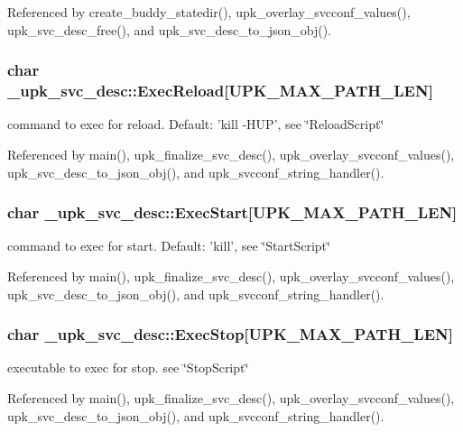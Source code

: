 Referenced by create\_\-buddy\_\-statedir(), upk\_\-overlay\_\-svcconf\_\-values(), upk\_\-svc\_\-desc\_\-free(), and upk\_\-svc\_\-desc\_\-to\_\-json\_\-obj().

\subsubsection[{ExecReload}]{\setlength{\rightskip}{0pt plus 5cm}char {\bf \_\-upk\_\-svc\_\-desc::ExecReload}[UPK\_\-MAX\_\-PATH\_\-LEN]}\label{struct__upk__svc__desc_a3759e27a023610aecef765eec3c84dda}
command to exec for reload. Default: 'kill -\/HUP', see \char`\"{}ReloadScript\char`\"{} 

Referenced by main(), upk\_\-finalize\_\-svc\_\-desc(), upk\_\-overlay\_\-svcconf\_\-values(), upk\_\-svc\_\-desc\_\-to\_\-json\_\-obj(), and upk\_\-svcconf\_\-string\_\-handler().

\subsubsection[{ExecStart}]{\setlength{\rightskip}{0pt plus 5cm}char {\bf \_\-upk\_\-svc\_\-desc::ExecStart}[UPK\_\-MAX\_\-PATH\_\-LEN]}\label{struct__upk__svc__desc_a1ec7b5c0c440bc0a7011fba7ff45edec}
command to exec for start. Default: 'kill', see \char`\"{}StartScript\char`\"{} 

Referenced by main(), upk\_\-finalize\_\-svc\_\-desc(), upk\_\-overlay\_\-svcconf\_\-values(), upk\_\-svc\_\-desc\_\-to\_\-json\_\-obj(), and upk\_\-svcconf\_\-string\_\-handler().

\subsubsection[{ExecStop}]{\setlength{\rightskip}{0pt plus 5cm}char {\bf \_\-upk\_\-svc\_\-desc::ExecStop}[UPK\_\-MAX\_\-PATH\_\-LEN]}\label{struct__upk__svc__desc_ab50cb8805f521274c6a47be718b71c1b}
executable to exec for stop. see \char`\"{}StopScript\char`\"{} 

Referenced by main(), upk\_\-finalize\_\-svc\_\-desc(), upk\_\-overlay\_\-svcconf\_\-values(), upk\_\-svc\_\-desc\_\-to\_\-json\_\-obj(), and upk\_\-svcconf\_\-string\_\-handler().

